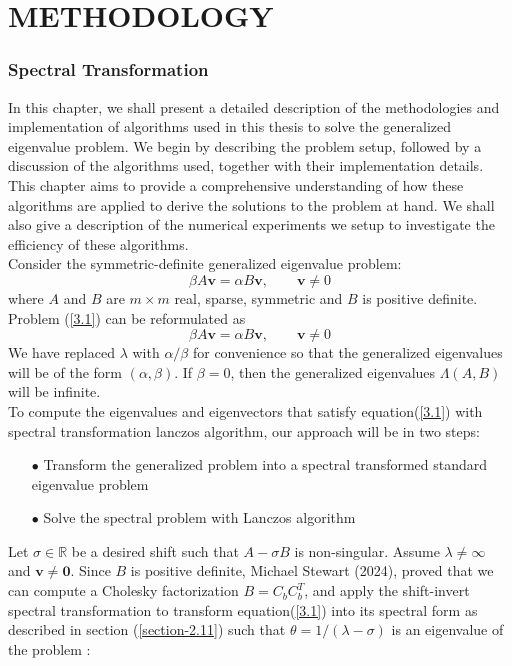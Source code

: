 \chapter{METHODOLOGY}
\subsection{Spectral Transformation}
In this chapter, we shall present a detailed description of the methodologies and implementation of algorithms used in this thesis to solve the generalized eigenvalue problem. We begin by describing the problem setup, followed by a discussion of the algorithms used, together with their implementation details. This chapter aims to provide a comprehensive understanding of how these algorithms are applied to derive the solutions to the problem at hand. We shall also give a description of the numerical experiments we setup to investigate the efficiency of these algorithms.\\
Consider the symmetric-definite generalized eigenvalue problem:
\begin{equation}\label{3.1}
	\beta A\mathbf{v} = \alpha B\mathbf{v}, \qquad \mathbf{v} \neq 0
\end{equation}
where $A$ and $B$ are $m \times m$ real, sparse, symmetric and $B$ is positive definite.\\
Problem (\ref{3.1}) can be reformulated  as
\begin{equation}\label{3.2}
	\beta A\mathbf{v} = \alpha B\mathbf{v}, \qquad \mathbf{v} \neq 0
\end{equation}
We have replaced $\lambda$ with $\alpha/\beta$ for convenience so that the generalized eigenvalues will be of the form $(\alpha, \beta)$. If $ \beta = 0$, then the generalized eigenvalues $\Lambda(A, B)$ will be infinite.\\
To compute the eigenvalues and eigenvectors that satisfy equation(\ref{3.1}) with spectral transformation lanczos algorithm, our approach will be in two steps:\\
\begin{itemize}
	\item[$\bullet$] Transform the generalized problem into a spectral transformed standard eigenvalue problem
	\item[$\bullet$] Solve the spectral problem with Lanczos algorithm 
\end{itemize}
Let $\sigma \in \mathbb{R}$ be a desired shift such that $A - \sigma B$ is non-singular. Assume $\lambda \neq \infty$ and $\mathbf{v} \neq \mathbf{0}$. Since $B$ is positive definite, Michael Stewart (2024), proved that we can compute a Cholesky factorization $B = C_bC_b^T$, and apply the shift-invert spectral transformation to transform equation(\ref{3.1}) into its spectral form as described in section (\ref{section-2.11}) such that $\theta = 1/(\lambda - \sigma)$ is an eigenvalue of the problem :
